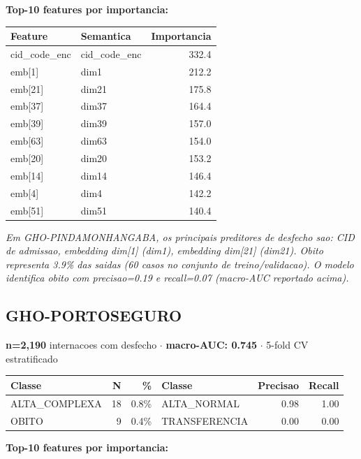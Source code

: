 \documentclass[11pt,a4paper]{article}
\begin{document}
\vspace{4pt}\noindent\textbf{Top-10 features por importancia:}

\begin{tabular}{llr}
\toprule
Feature & Semantica & Importancia \\
\midrule
cid\_code\_enc & cid\_code\_enc & 332.4 \\
emb[1] & dim1 & 212.2 \\
emb[21] & dim21 & 175.8 \\
emb[37] & dim37 & 164.4 \\
emb[39] & dim39 & 157.0 \\
emb[63] & dim63 & 154.0 \\
emb[20] & dim20 & 153.2 \\
emb[14] & dim14 & 146.4 \\
emb[4] & dim4 & 142.2 \\
emb[51] & dim51 & 140.4 \\
\bottomrule
\end{tabular}

\vspace{4pt}\noindent\textit{Em GHO-PINDAMONHANGABA, os principais preditores de desfecho sao: CID de admissao, embedding dim[1] (dim1), embedding dim[21] (dim21). Obito representa 3.9\% das saidas (60 casos no conjunto de treino/validacao). O modelo identifica obito com precisao=0.19 e recall=0.07 (macro-AUC reportado acima).}

\subsection{GHO-PORTOSEGURO}
\textbf{n=2,190} internacoes com desfecho $\cdot$ \textbf{macro-AUC: 0.745} $\cdot$ 5-fold CV estratificado

\begin{tabular}{lrr|lrr}
\toprule
Classe & N & \% & Classe & Precisao & Recall \\
\midrule
ALTA\_COMPLEXA & 18 & 0.8\% & ALTA\_NORMAL & 0.98 & 1.00 \\
OBITO & 9 & 0.4\% & TRANSFERENCIA & 0.00 & 0.00 \\
\bottomrule
\end{tabular}

\vspace{4pt}\noindent\textbf{Top-10 features por importancia:}
\end{document}
